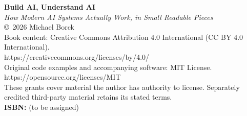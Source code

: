 \thispagestyle{empty}
\vspace*{2in}
\begin{center}
\textbf{\large Build AI, Understand AI}\\[0.3em]
\textit{How Modern AI Systems Actually Work, in Small Readable Pieces}\\[1em]
\copyright\ 2026 Michael Borck\\[0.5em]
Book content: Creative Commons Attribution 4.0 International (CC BY 4.0 International).\\
https://creativecommons.org/licenses/by/4.0/\\[0.5em]
Original code examples and accompanying software: MIT License.\\
https://opensource.org/licenses/MIT\\[0.5em]
These grants cover material the author has authority to license. Separately credited third-party material retains its stated terms.\\[1em]
\textbf{ISBN:} (to be assigned)\\[1em]
\end{center}
\clearpage
